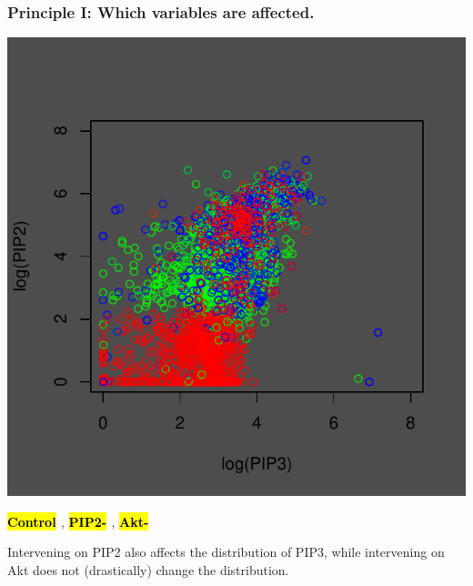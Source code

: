 \documentclass{beamer}
\makeatletter
\newcommand\SoulColor{%
  \let\set@color\beamerorig@set@color
  \let\reset@color\beamerorig@reset@color}
\makeatother
\begin{document}
\begin{frame}
\frametitle{Principle I: Which variables are affected.}

\begin{center}
\includegraphics[scale = 0.5]{../images/plot01_04.pdf}
\end{center}

\begin{center}
\textbf{\textcolor{white}{\SoulColor\hl{ Control }}},
\textbf{\textcolor{white}{\SoulColor\hl{ PIP2- }}}, 
\textbf{\textcolor{white}{\SoulColor\hl{ Akt- }}}
\end{center}

Intervening on PIP2 also affects the distribution of PIP3,
while intervening on Akt does not (drastically) change the distribution.

\end{frame}
\end{document}
